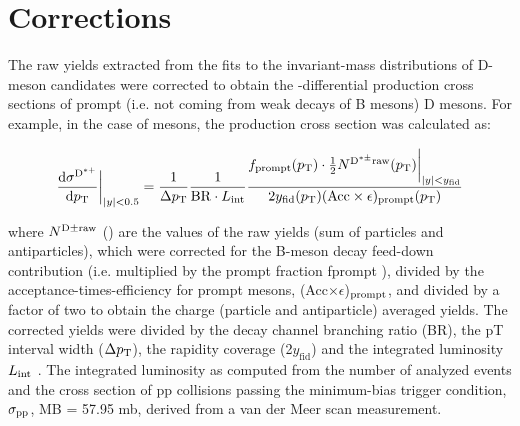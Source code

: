 \section{Corrections}
\label{sec:eff}


The raw yields extracted from the fits to the invariant-mass distributions of D-meson candidates were
corrected to obtain the \pt -differential production cross sections of prompt (i.e. not coming from weak
decays of B mesons) D mesons. For example, in the case of \Dstar mesons, the production cross section
was calculated as:

\begin{equation}
 \label{eq:effMethod}
 \frac{\mathrm{d}\sigma^{\rm D^{\ast +}}}{\mathrm{d}p_{\mathrm{T}}}\bigg\rvert_{|y|<0.5} = \frac{1}{\Delta p_{\mathrm{T}}} \frac{1}{\mathrm{BR} \cdot {L_{\rm int}}} \frac{f_{\mathrm{prompt}}(p_{\mathrm{T}})\cdot \frac{1}{2} N^{\mathrm{D^{\ast \pm}raw}}(p_{\mathrm{T}})\bigg\rvert_{|y| < y_{\mathrm{fid}}}}{ 2y_{\rm fid}(p_{\rm T})(\mathrm{Acc}\times\epsilon)_{\mathrm{prompt}}(p_{\mathrm{T}})  }
\end{equation}


where $N^{\rm D{\pm \rm raw}}$ (\pt) are the values of the raw yields (sum of particles and antiparticles), which were corrected for the B-meson decay feed-down contribution (i.e. multiplied by the prompt fraction fprompt ),
divided by the acceptance-times-efficiency for prompt \Dstar mesons, (Acc$\times \epsilon$)$_{\rm prompt}$, and divided by a factor of two to obtain the charge (particle and antiparticle) averaged yields. The corrected yields were divided by the decay channel branching ratio (BR), the pT interval width ($\Delta p_{\rm T}$), the rapidity coverage (2$y_{\mathrm{fid}}$) and the integrated luminosity $L_{\rm int}$ . The integrated luminosity as computed from the number of analyzed events and the cross section of pp collisions passing the minimum-bias trigger condition, $\sigma_{\rm pp}$, MB = 57.95 mb, derived from a van der Meer scan measurement.

